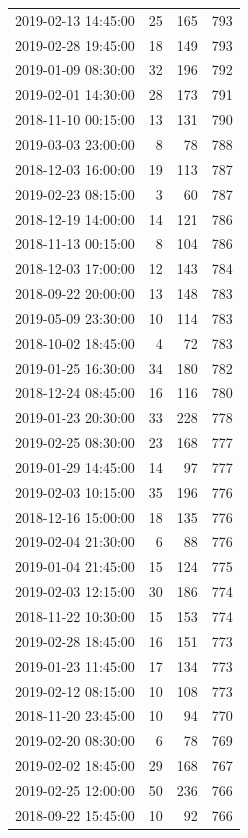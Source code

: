 \begin{tabular}{lrrr}
2019-02-13 14:45:00 & 25 & 165 & 793 \\
2019-02-28 19:45:00 & 18 & 149 & 793 \\
2019-01-09 08:30:00 & 32 & 196 & 792 \\
2019-02-01 14:30:00 & 28 & 173 & 791 \\
2018-11-10 00:15:00 & 13 & 131 & 790 \\
2019-03-03 23:00:00 & 8 & 78 & 788 \\
2018-12-03 16:00:00 & 19 & 113 & 787 \\
2019-02-23 08:15:00 & 3 & 60 & 787 \\
2018-12-19 14:00:00 & 14 & 121 & 786 \\
2018-11-13 00:15:00 & 8 & 104 & 786 \\
2018-12-03 17:00:00 & 12 & 143 & 784 \\
2018-09-22 20:00:00 & 13 & 148 & 783 \\
2019-05-09 23:30:00 & 10 & 114 & 783 \\
2018-10-02 18:45:00 & 4 & 72 & 783 \\
2019-01-25 16:30:00 & 34 & 180 & 782 \\
2018-12-24 08:45:00 & 16 & 116 & 780 \\
2019-01-23 20:30:00 & 33 & 228 & 778 \\
2019-02-25 08:30:00 & 23 & 168 & 777 \\
2019-01-29 14:45:00 & 14 & 97 & 777 \\
2019-02-03 10:15:00 & 35 & 196 & 776 \\
2018-12-16 15:00:00 & 18 & 135 & 776 \\
2019-02-04 21:30:00 & 6 & 88 & 776 \\
2019-01-04 21:45:00 & 15 & 124 & 775 \\
2019-02-03 12:15:00 & 30 & 186 & 774 \\
2018-11-22 10:30:00 & 15 & 153 & 774 \\
2019-02-28 18:45:00 & 16 & 151 & 773 \\
2019-01-23 11:45:00 & 17 & 134 & 773 \\
2019-02-12 08:15:00 & 10 & 108 & 773 \\
2018-11-20 23:45:00 & 10 & 94 & 770 \\
2019-02-20 08:30:00 & 6 & 78 & 769 \\
2019-02-02 18:45:00 & 29 & 168 & 767 \\
2019-02-25 12:00:00 & 50 & 236 & 766 \\
2018-09-22 15:45:00 & 10 & 92 & 766 \\

\end{tabular}
